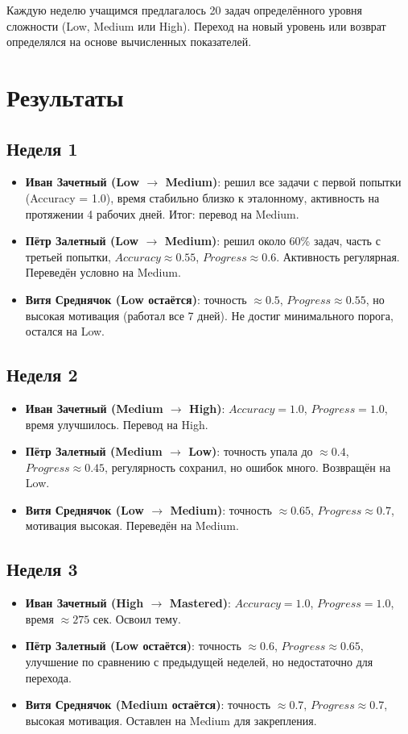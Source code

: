 \documentclass[12pt,a4paper]{article}
\begin{document}
Каждую неделю учащимся предлагалось 20 задач определённого уровня сложности (Low, Medium или High). 
Переход на новый уровень или возврат определялся на основе вычисленных показателей.

\section{Результаты}

\subsection{Неделя 1}
\begin{itemize}
    \item \textbf{Иван Зачетный (Low $\rightarrow$ Medium)}: 
    решил все задачи с первой попытки (Accuracy = 1.0), время стабильно близко к эталонному, активность на протяжении 4 рабочих дней. Итог: перевод на Medium.
    \item \textbf{Пётр Залетный (Low $\rightarrow$ Medium)}: 
    решил около 60\% задач, часть с третьей попытки, $Accuracy \approx 0.55$, $Progress \approx 0.6$. Активность регулярная. Переведён условно на Medium.
    \item \textbf{Витя Среднячок (Low остаётся)}: 
    точность $\approx 0.5$, $Progress \approx 0.55$, но высокая мотивация (работал все 7 дней). Не достиг минимального порога, остался на Low.
\end{itemize}

\subsection{Неделя 2}
\begin{itemize}
    \item \textbf{Иван Зачетный (Medium $\rightarrow$ High)}: 
    $Accuracy = 1.0$, $Progress = 1.0$, время улучшилось. Перевод на High.
    \item \textbf{Пётр Залетный (Medium $\rightarrow$ Low)}: 
    точность упала до $\approx 0.4$, $Progress \approx 0.45$, регулярность сохранил, но ошибок много. Возвращён на Low.
    \item \textbf{Витя Среднячок (Low $\rightarrow$ Medium)}: 
    точность $\approx 0.65$, $Progress \approx 0.7$, мотивация высокая. Переведён на Medium.
\end{itemize}

\subsection{Неделя 3}
\begin{itemize}
    \item \textbf{Иван Зачетный (High $\rightarrow$ Mastered)}: 
    $Accuracy = 1.0$, $Progress = 1.0$, время $\approx 275$ сек. Освоил тему.
    \item \textbf{Пётр Залетный (Low остаётся)}: 
    точность $\approx 0.6$, $Progress \approx 0.65$, улучшение по сравнению с предыдущей неделей, но недостаточно для перехода.
    \item \textbf{Витя Среднячок (Medium остаётся)}: 
    точность $\approx 0.7$, $Progress \approx 0.7$, высокая мотивация. Оставлен на Medium для закрепления.
\end{itemize}
\end{document}
